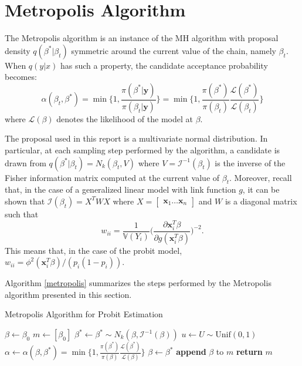 \documentclass{article}
\newcommand{\V}[0]{\mathbb{V}}
\renewcommand{\vec}[1]{\mathbf{#1}}
\begin{document}
\section{Metropolis Algorithm}
The Metropolis algorithm is an instance of the MH algorithm with proposal density \(q(\beta^*|\beta_t)\) symmetric around the current value of the chain, namely \(\beta_t\). When \(q(y|x)\) has such a property, the candidate acceptance probability becomes:
\begin{equation*}
    \alpha(\beta_t, \beta^*) = \min\Bigg\{1, \frac{\pi(\beta^*|\vec{y})}{\pi(\beta_t|\vec{y})}\Bigg\} = \min\Bigg\{1, \frac{\pi(\beta^*)}{\pi(\beta_t)}\frac{\mathcal{L}(\beta^*)}{\mathcal{L}(\beta_t)}\Bigg\}
\end{equation*}
where \(\mathcal{L}(\beta)\) denotes the likelihood of the model at \(\beta\).
\par
The proposal used in this report is a multivariate normal distribution. In particular, at each sampling step performed by the algorithm, a candidate is drawn from \(q(\beta^*|\beta_t) = N_k(\beta_t,V)\) where \(V = \mathcal{I}^{-1}(\beta_t)\) is the inverse of the Fisher information matrix computed at the current value of \(\beta_t\). Moreover, recall that, in the case of a generalized linear model with link function \(g\), it can be shown that \(\mathcal{I}(\beta_t) = X^T W X\) where \(X = \begin{bmatrix} \vec{x}_1 \hdots \vec{x}_n \end{bmatrix}\) and \(W\) is a diagonal matrix such that 
\begin{equation*}
    w_{ii} = \frac{1}{\V(Y_i)}\bigg(\frac{\partial \vec{x}_i^T \beta}{\partial g(\vec{x}_i^T \beta)}\bigg)^{-2}.
\end{equation*}
This means that, in the case of the probit model, \(w_{ii} = \phi^2(\vec{x}_i^T \beta)/(p_i(1 - p_i))\).
\par 
Algorithm \ref{metropolis} summarizes the steps performed by the Metropolis algorithm presented in this section.

\begin{algorithm}
\caption{Metropolis Algorithm for Probit Estimation}\label{metropolis}
\begin{algorithmic}[1]
    \State $\beta \gets \beta_0$
    \State $m \gets [\beta_0]$
    \Repeat
        \State $\beta^* \gets \beta^* \sim N_k(\beta,\mathcal{I}^{-1}(\beta))$
        \State $u \gets U \sim \text{Unif}(0, 1)$
        \State $\alpha \gets \alpha(\beta, \beta^*) = \min\big\{1, \frac{\pi(\beta^*)}{\pi(\beta)}\frac{\mathcal{L}(\beta^*)}{\mathcal{L}(\beta)}\big\}$
            \State $\beta \gets \beta^*$
        \EndIf
        \State \textbf{append} $\beta$ to $m$
    \State \textbf{return} $m$
\EndProcedure
\end{algorithmic}
\end{algorithm}
\end{document}
